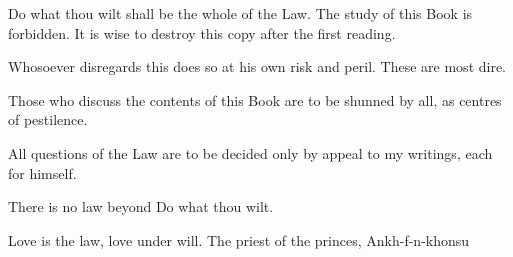 Do what thou wilt shall be the whole of the Law.
The study of this Book is forbidden. It is wise to destroy this copy after the first reading.

Whosoever disregards this does so at his own risk and peril. These are most dire.

Those who discuss the contents of this Book are to be shunned by all, as centres of pestilence.

All questions of the Law are to be decided only by appeal to my writings, each for himself.

There is no law beyond Do what thou wilt.

Love is the law, love under will.
The priest of the princes,
Ankh-f-n-khonsu
